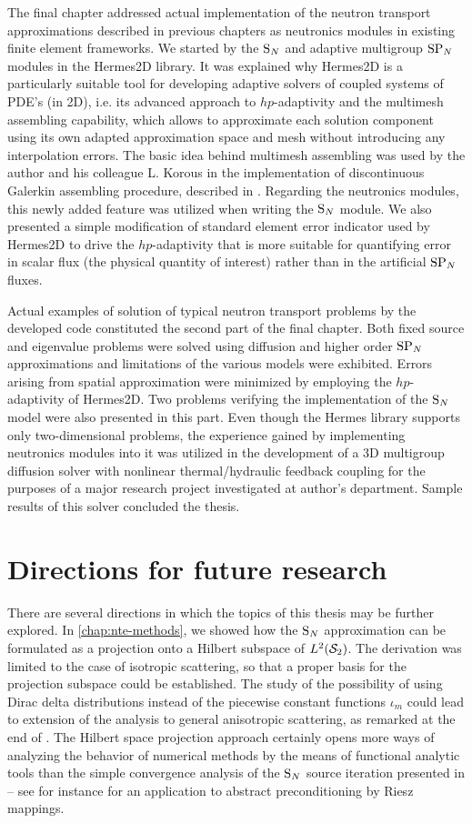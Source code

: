\documentclass[twoside, 12pt]{thesis}
\begin{document}
The final chapter addressed actual implementation of the neutron transport approximations described in previous chapters
as neutronics modules in existing finite element frameworks. We started by the $\SN$ and adaptive multigroup $\SPN$
modules in the Hermes2D library. It was explained why Hermes2D is a particularly suitable tool for developing adaptive
solvers of coupled systems of PDE's (in 2D), i.e. its advanced approach to $hp$-adaptivity and the multimesh assembling
capability, which allows to approximate each solution component using its own adapted approximation space and mesh
without introducing any interpolation errors. The basic idea behind multimesh assembling was used by the author and his
colleague L. Korous in the implementation of discontinuous Galerkin assembling procedure, described in
.
Regarding the neutronics modules, this newly added feature was utilized when writing the $\SN$ module. We also presented
a simple modification of standard element error indicator used by Hermes2D to drive the $hp$-adaptivity that is more
suitable for quantifying error in scalar flux (the physical quantity of interest) rather than in the artificial $\SPN$
fluxes.

Actual examples of solution of typical neutron transport problems by the developed code constituted the second part of
the final chapter. Both fixed source and eigenvalue problems were solved using diffusion and higher order $\SPN$
approximations and limitations of the various models were exhibited. Errors arising from spatial approximation were
minimized by employing the $hp$-adaptivity of Hermes2D. Two problems verifying the implementation of the $\SN$
model were also presented in this part. Even though the Hermes library supports only two-dimensional problems, the
experience gained by implementing neutronics modules into it was utilized in the development of a 3D
multigroup diffusion solver with nonlinear thermal/hydraulic feedback coupling for the purposes of a major research
project investigated at author's department. Sample results of this solver concluded the thesis.

\section*{Directions for future research}
There are several directions in which the topics of this thesis may be further explored. In \cref{chap:nte-methods}, we
showed how the $\SN$ approximation can be formulated as a projection onto a Hilbert subspace of $\Lp[2](\Sphere)$. The
derivation was limited to the case of isotropic scattering, so that a proper basis for the projection subspace could be
established. The study of the possibility of using Dirac delta distributions instead of the piecewise constant
functions $\iota_m$ could lead to extension of the analysis to general anisotropic scattering, as remarked at the end of 
. The Hilbert space projection approach certainly opens more ways of analyzing the behavior of
numerical methods by the means of functional analytic tools than the simple convergence analysis of the $\SN$ source
iteration presented in  -- see for instance \cite{Kirby} for an application to abstract preconditioning
 by Riesz mappings.
 
\end{document}

